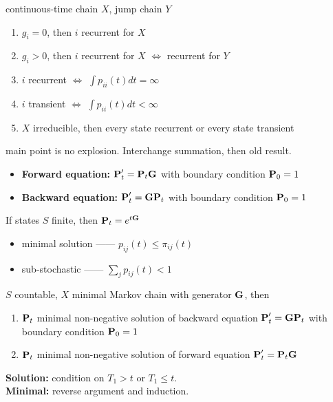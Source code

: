 \begin{thm}
    continuous-time chain $X$, jump chain $Y$
    \begin{enumerate}
        \item $g_i = 0$, then $i$ recurrent for $X$
        \item $g_i > 0$, then $i$ recurrent for $X$ $\iff$ recurrent for $Y$
        \item $i$ recurrent $\iff$ $\int p_{ii}(t)dt = \infty$
        \item $i$ transient $\iff$ $\int p_{ii}(t)dt < \infty$
        \item $X$ irreducible, then every state recurrent or every state transient
    \end{enumerate}
\end{thm}
\begin{pf}
    main point is no explosion.
    Interchange summation, then old result.
\end{pf}

\begin{itemize}
    \item \textbf{Forward equation:} $\textbf{P}_t' = \textbf{P}_t \textbf{G}$ with boundary condition $\textbf{P}_0 = 1$
    \item \textbf{Backward equation:} $\textbf{P}_t' = \textbf{G} \textbf{P}_t$  with boundary condition $\textbf{P}_0 = 1$
\end{itemize}

\begin{fact}
    If states $S$ finite, then $\textbf{P}_t = e^{t\textbf{G}}$
\end{fact}

\begin{itemize}
    \item minimal solution ------ $p_{ij}(t) \leq \pi_{ij}(t)$
    \item sub-stochastic ------ $\sum_j p_{ij}(t) < 1$
\end{itemize}

\begin{thm}
    $S$ countable, $X$ minimal Markov chain with generator $\textbf{G}$, then
    \begin{enumerate}
        \item $\textbf{P}_t$ minimal non-negative solution of backward equation $\textbf{P}_t' = \textbf{G} \textbf{P}_t$  with boundary condition $\textbf{P}_0 = 1$
        \item $\textbf{P}_t$ minimal non-negative solution of forward equation $\textbf{P}_t' = \textbf{P}_t \textbf{G}$
    \end{enumerate}
\end{thm}
\begin{pf}
    \textbf{Solution:} condition on $T_1 > t$ or $T_1 \leq t$.\\
    \textbf{Minimal:} reverse argument and induction.
\end{pf}

